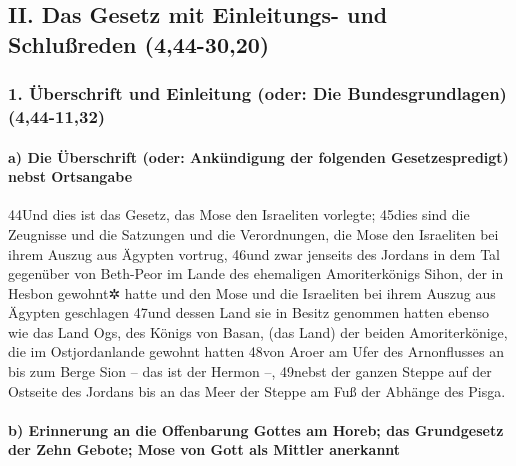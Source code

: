 \hypertarget{ii.-das-gesetz-mit-einleitungs--und-schluuxdfreden-444-3020}{%
\subsection{II. Das Gesetz mit Einleitungs- und Schlußreden
(4,44-30,20)}\label{ii.-das-gesetz-mit-einleitungs--und-schluuxdfreden-444-3020}}

\hypertarget{uxfcberschrift-und-einleitung-oder-die-bundesgrundlagen-444-1132}{%
\subsubsection{1. Überschrift und Einleitung (oder: Die
Bundesgrundlagen)
(4,44-11,32)}\label{uxfcberschrift-und-einleitung-oder-die-bundesgrundlagen-444-1132}}

\hypertarget{a-die-uxfcberschrift-oder-ankuxfcndigung-der-folgenden-gesetzespredigt-nebst-ortsangabe}{%
\paragraph{a) Die Überschrift (oder: Ankündigung der folgenden
Gesetzespredigt) nebst
Ortsangabe}\label{a-die-uxfcberschrift-oder-ankuxfcndigung-der-folgenden-gesetzespredigt-nebst-ortsangabe}}

44Und dies ist das Gesetz, das Mose den Israeliten vorlegte; 45dies sind
die Zeugnisse und die Satzungen und die Verordnungen, die Mose den
Israeliten bei ihrem Auszug aus Ägypten vortrug, 46und zwar jenseits des
Jordans in dem Tal gegenüber von Beth-Peor im Lande des ehemaligen
Amoriterkönigs Sihon, der in Hesbon gewohnt✲ hatte und den Mose und die
Israeliten bei ihrem Auszug aus Ägypten geschlagen 47und dessen Land sie
in Besitz genommen hatten ebenso wie das Land Ogs, des Königs von Basan,
(das Land) der beiden Amoriterkönige, die im Ostjordanlande gewohnt
hatten 48von Aroer am Ufer des Arnonflusses an bis zum Berge Sion -- das
ist der Hermon --, 49nebst der ganzen Steppe auf der Ostseite des
Jordans bis an das Meer der Steppe am Fuß der Abhänge des Pisga.

\hypertarget{b-erinnerung-an-die-offenbarung-gottes-am-horeb-das-grundgesetz-der-zehn-gebote-mose-von-gott-als-mittler-anerkannt}{%
\paragraph{b) Erinnerung an die Offenbarung Gottes am Horeb; das
Grundgesetz der Zehn Gebote; Mose von Gott als Mittler
anerkannt}\label{b-erinnerung-an-die-offenbarung-gottes-am-horeb-das-grundgesetz-der-zehn-gebote-mose-von-gott-als-mittler-anerkannt}}

